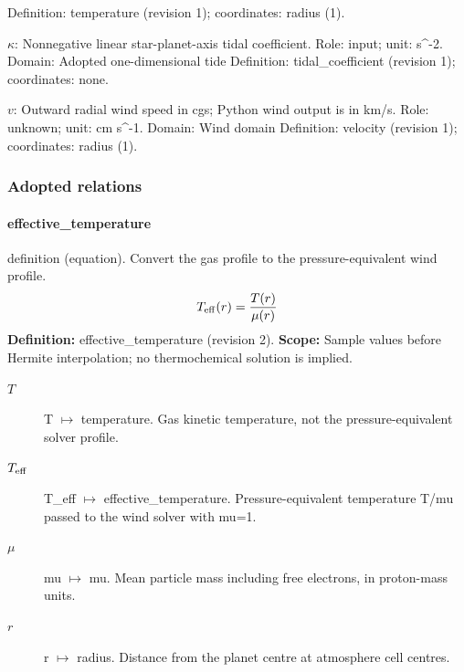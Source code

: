 \begin{description}
\newline Definition: temperature (revision 1); coordinates: radius (1).
\item[tidal\_coefficient] $\kappa$: Nonnegative linear star-planet-axis tidal coefficient.
\newline Role: input; unit: s\textasciicircum{}-2.
\newline Domain: Adopted one-dimensional tide
\newline Definition: tidal\_coefficient (revision 1); coordinates: none.
\item[velocity] $v$: Outward radial wind speed in cgs; Python wind output is in km/s.
\newline Role: unknown; unit: cm s\textasciicircum{}-1.
\newline Domain: Wind domain
\newline Definition: velocity (revision 1); coordinates: radius (1).
\end{description}

\subsubsection*{Adopted relations}

\paragraph{effective\_temperature}
definition (equation). Convert the gas profile to the pressure-equivalent wind profile.
\begin{equation}
\begin{aligned}
T_{\rm eff}{\left(r \right)} = \frac{T{\left(r \right)}}{\mu{\left(r \right)}}
\end{aligned}
\label{eq:escape.mathematical_5f_model_3a_composition_5f_wind:effective_5f_temperature:2}
\end{equation}
\noindent\textbf{Definition:} effective\_temperature (revision 2).
\textbf{Scope:} Sample values before Hermite interpolation; no thermochemical solution is implied.

\begin{description}
\item[$T$] T $\mapsto$ temperature. Gas kinetic temperature, not the pressure-equivalent solver profile.
\item[$T_{\rm eff}$] T\_eff $\mapsto$ effective\_temperature. Pressure-equivalent temperature T/mu passed to the wind solver with mu=1.
\item[$\mu$] mu $\mapsto$ mu. Mean particle mass including free electrons, in proton-mass units.
\item[$r$] r $\mapsto$ radius. Distance from the planet centre at atmosphere cell centres.
\end{description}

